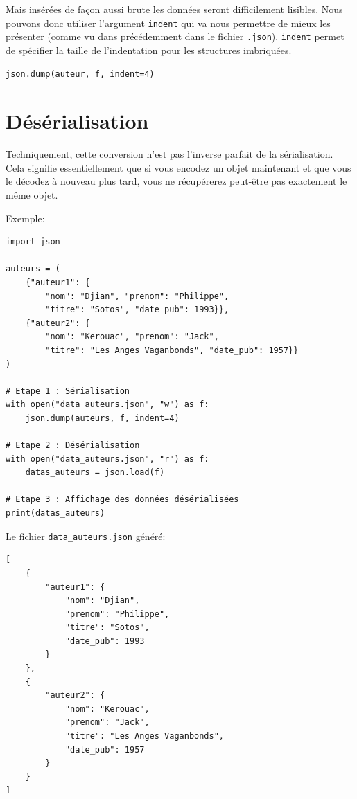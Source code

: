 \documentclass[a4paper,12pt]{book}
\begin{document}
Mais insérées de façon aussi brute les données seront difficilement lisibles. Nous pouvons donc utiliser l'argument \texttt{indent} qui va nous permettre de mieux les présenter (comme vu dans précédemment dans le fichier \texttt{.json}). \texttt{indent} permet de spécifier la taille de l'indentation pour les structures imbriquées.
\begin{lstlisting}[caption=Ecriture de données avec indentation]
	json.dump(auteur, f, indent=4)
\end{lstlisting}
\medskip

\section{Désérialisation}
Techniquement, cette conversion n'est pas l'inverse parfait de la sérialisation. Cela signifie essentiellement que si vous encodez un objet maintenant et que vous le décodez à nouveau plus tard, vous ne récupérerez peut-être pas exactement le même objet.
\medskip

Exemple:
\begin{lstlisting}[caption=Sérialisation et désérialisation]
import json

auteurs = (
    {"auteur1": {
        "nom": "Djian", "prenom": "Philippe",
        "titre": "Sotos", "date_pub": 1993}},
    {"auteur2": {
        "nom": "Kerouac", "prenom": "Jack",
        "titre": "Les Anges Vaganbonds", "date_pub": 1957}}
)

# Etape 1 : Sérialisation
with open("data_auteurs.json", "w") as f:
    json.dump(auteurs, f, indent=4)

# Etape 2 : Désérialisation
with open("data_auteurs.json", "r") as f:
    datas_auteurs = json.load(f)

# Etape 3 : Affichage des données désérialisées
print(datas_auteurs)
\end{lstlisting}\label{deserialisationJSON}
\medskip

Le fichier \texttt{data\_auteurs.json} généré:
\begin{lstlisting}[caption=Le fichier \texttt{.json} obtenu grâce à la sérialisation]
[
    {
        "auteur1": {
            "nom": "Djian",
            "prenom": "Philippe",
            "titre": "Sotos",
            "date_pub": 1993
        }
    },
    {
        "auteur2": {
            "nom": "Kerouac",
            "prenom": "Jack",
            "titre": "Les Anges Vaganbonds",
            "date_pub": 1957
        }
    }
]
\end{lstlisting}
\medskip
\end{document}

